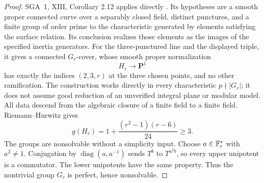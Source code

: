 \begin{proof}
SGA~1, XIII, Corollary 2.12 applies directly
\citep{A_SGA1}. Its hypotheses are a smooth proper
connected curve over a separably closed field, distinct
punctures, and a finite group of order prime to the
characteristic generated by elements satisfying the
surface relation. Its conclusion realizes those elements
as the images of the specified inertia generators.
For the three-punctured line and the displayed triple,
it gives a connected $G_r$-cover, whose smooth proper
normalization
\[
 H_r\longrightarrow\mathbf P^1
\]
has exactly the indices $(2,3,r)$ at the three chosen
points, and no other ramification. The construction
works directly in every characteristic $p\nmid|G_r|$;
it does not assume good reduction of an unverified
integral plane or modular model. All data descend
from the algebraic closure of a finite field to a
finite field. Riemann--Hurwitz gives
\[
 g(H_r)=1+\frac{(r^2-1)(r-6)}{24}\ge3.
\]
The groups are nonsolvable without a simplicity input.
Choose $a\in\mathbb F_r^*$ with $a^2\ne1$. Conjugation by
$\operatorname{diag}(a,a^{-1})$ sends $T^b$ to
$T^{a^2b}$, so every upper unipotent is a commutator.
The lower unipotents have the same property. Thus the
nontrivial group $G_r$ is perfect, hence nonsolvable.


\end{proof}

